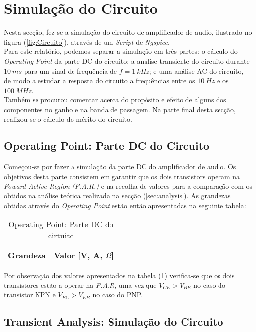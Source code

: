 \section{Simulação do Circuito}
\label{sec:simulation}

Nesta secção, fez-se a simulação do circuito de amplificador de audio, ilustrado no figura (\ref{fig:Circuito}),
através de um \emph{Script} de \emph{Ngspice}.
\\
Para este relatório, podemos separar a simulação em três partes: o cálculo do \emph{Operating Point} da
parte DC do circuito; a análise transiente do circuito durante $10 \: ms$ para um sinal de frequência de 
$f = 1 \: kHz$; e uma análise AC do circuito, de modo a estudar a resposta do circuito a frequências entre
os $10 \:Hz$ e os $100 \: MHz$.
\\
Também se procurou comentar acerca do propósito e efeito de alguns dos componentes no ganho e na banda de passagem.
Na parte final desta secção, realizou-se o cálculo do mérito do circuito.


\subsection{Operating Point: Parte DC do Circuito}

Começou-se por fazer a simulação da parte DC do amplificador de audio. Os objetivos desta parte consistem em garantir
que os dois transistors operam na \emph{Foward Active Region (F.A.R.)} e na recolha de valores para a comparação
com os obtidos na análise teórica realizada na secção (\ref{sec:analysis}).
As grandezas obtidas através do \emph{Operating Point} estão então apresentadas na seguinte tabela:

\begin{table}[H]
  \centering
  \begin{tabular}{|l|r|}
  \hline    
  {\bf Grandeza} & {\bf Valor [V, A, $\Omega$]} \\ \hline
  
  \end{tabular}
  \caption{Operating Point: Parte DC do cirtuito}
  \label{tab:OPSimValues}
\end{table}

Por observação dos valores apresentados na tabela (\ref{tab:OPSimValues}) verifica-se que os dois 
transistores estão a operar na \emph{F.A.R}, uma vez que $V_{CE} > V_{BE}$ no caso do transistor NPN e 
$V_{EC} > V_{EB}$ no caso do PNP.


\subsection{Transient Analysis: Simulação do Circuito}

